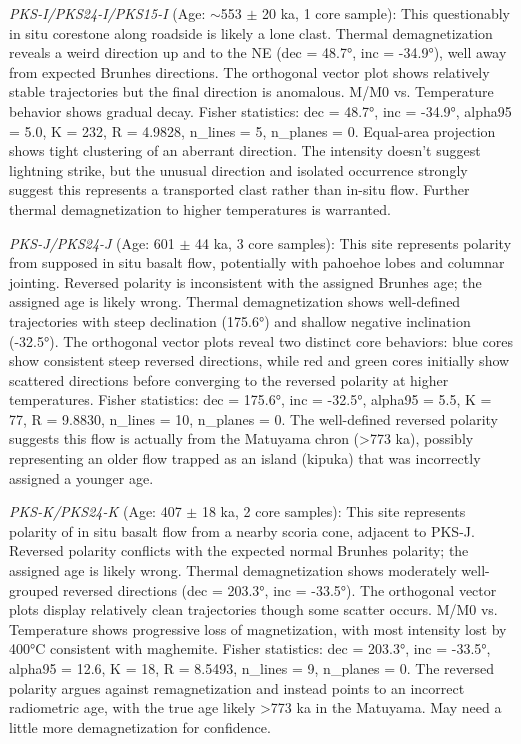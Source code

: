 \documentclass[twocolumn,11pt]{article}
\begin{document}
\textit{PKS-I/PKS24-I/PKS15-I} (Age: $\sim$553 $\pm$ 20 ka, 1 core sample): This questionably in situ corestone along roadside is likely a lone clast. Thermal demagnetization reveals a weird direction up and to the NE (dec = 48.7°, inc = -34.9°), well away from expected Brunhes directions. The orthogonal vector plot shows relatively stable trajectories but the final direction is anomalous. M/M0 vs. Temperature behavior shows gradual decay. Fisher statistics: dec = 48.7°, inc = -34.9°, alpha95 = 5.0, K = 232, R = 4.9828, n\_lines = 5, n\_planes = 0. Equal-area projection shows tight clustering of an aberrant direction. The intensity doesn't suggest lightning strike, but the unusual direction and isolated occurrence strongly suggest this represents a transported clast rather than in-situ flow. Further thermal demagnetization to higher temperatures is warranted.

\textit{PKS-J/PKS24-J} (Age: 601 $\pm$ 44 ka, 3 core samples): This site represents polarity from supposed in situ basalt flow, potentially with pahoehoe lobes and columnar jointing. Reversed polarity is inconsistent with the assigned Brunhes age; the assigned age is likely wrong. Thermal demagnetization shows well-defined trajectories with steep declination (175.6°) and shallow negative inclination (-32.5°). The orthogonal vector plots reveal two distinct core behaviors: blue cores show consistent steep reversed directions, while red and green cores initially show scattered directions before converging to the reversed polarity at higher temperatures. Fisher statistics: dec = 175.6°, inc = -32.5°, alpha95 = 5.5, K = 77, R = 9.8830, n\_lines = 10, n\_planes = 0. The well-defined reversed polarity suggests this flow is actually from the Matuyama chron (>773 ka), possibly representing an older flow trapped as an island (kipuka) that was incorrectly assigned a younger age.

\textit{PKS-K/PKS24-K} (Age: 407 $\pm$ 18 ka, 2 core samples): This site represents polarity of in situ basalt flow from a nearby scoria cone, adjacent to PKS-J. Reversed polarity conflicts with the expected normal Brunhes polarity; the assigned age is likely wrong. Thermal demagnetization shows moderately well-grouped reversed directions (dec = 203.3°, inc = -33.5°). The orthogonal vector plots display relatively clean trajectories though some scatter occurs. M/M0 vs. Temperature shows progressive loss of magnetization, with most intensity lost by 400°C consistent with maghemite. Fisher statistics: dec = 203.3°, inc = -33.5°, alpha95 = 12.6, K = 18, R = 8.5493, n\_lines = 9, n\_planes = 0. The reversed polarity argues against remagnetization and instead points to an incorrect radiometric age, with the true age likely >773 ka in the Matuyama. May need a little more demagnetization for confidence.
\end{document}
